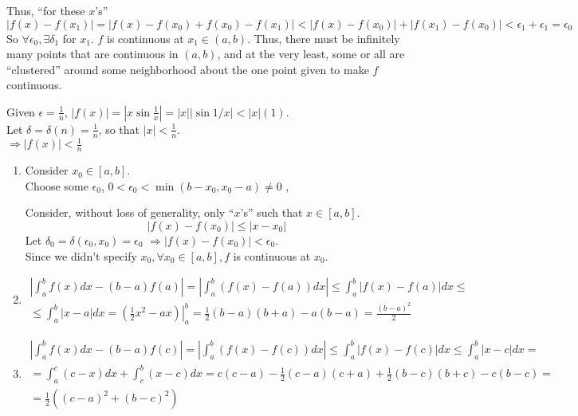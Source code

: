 \documentclass[twoside]{amsart}
\theoremstyle{plain}
\theoremstyle{definition}
\newcommand{\exercisehead}[1]
  {\smallskip
   \noindent{\small\bf Exercise #1.}}
\begin{document}
Thus, ``for these $x$'s''
\[
| f(x) - f(x_1) | = |f(x) -f(x_0) + f(x_0) -f(x_1) | < | f(x) -f(x_0)| + |f(x_1) -f(x_0)| < \epsilon_1 + \epsilon_1 = \epsilon_0
\]
So $\forall \epsilon_0, \exists \delta_1$ for $x_1$.  $f$ is continuous at $x_1 \in (a,b)$.  Thus, there must be infinitely many points that are continuous in $(a,b)$, and at the very least, some or all are ``clustered'' around some neighborhood about the one point given to make $f$ continuous.  

\exercisehead{32} Given $\epsilon = \frac{1}{n}$, $|f(x)| = |x \sin{ \frac{1}{x} } | = |x| | \sin{ 1/x} | < |x| (1) $.  \\
\quad Let $\delta = \delta(n) = \frac{1}{n}$, so that $|x| < \frac{1}{n}$.  \\
$\Longrightarrow |f(x) | <\frac{1}{n}$

\exercisehead{33} \begin{enumerate}
\item Consider $x_0 \in [a,b]$.  \medskip \\
Choose some $\epsilon_0$, $0 < \epsilon_0 < \min{ (b-x_0, x_0 -a ) } \neq 0$ , \,  

Consider, without loss of generality, only ``$x$'s'' such that $x \in [a,b]$.  
\[
|f(x) -f(x_0)| \leq |x -x_0|
\]
Let $\delta_0 = \delta(\epsilon_0,x_0) = \epsilon_0$ $\Longrightarrow |f(x)-f(x_0)| < \epsilon_0$.  \medskip \\
Since we didn't specify $x_0, \forall x_0 \in [a,b], f$ is continuous at $x_0$.  
\item \[
\begin{gathered}
\left| \int_a^b f(x) dx - (b-a) f(a) \right| = \left| \int_a^b (f(x) -f(a)) dx \right| \leq \int_a^b |f(x) -f(a) | dx \leq \\
\leq \int_a^b |x-a| dx = \left. (\frac{1}{2} x^2 -ax ) \right|_a^b = \frac{1}{2} (b-a)(b+a) - a(b-a) = \frac{ (b-a)^2}{2} 
\end{gathered}
\]
\item \[
\begin{gathered}
  \left| \int_a^b f(x) dx - (b-a) f(c) \right| = \left| \int_a^b (f(x) -f(c) ) dx \right| \leq \int_a^b |f(x) -f(c) | dx \leq \int_a^b |x-c| dx = \\
  = \int_a^c (c-x)dx + \int_c^b (x-c) dx = c(c-a) - \frac{1}{2} (c-a)(c+a) + \frac{1}{2} (b-c)(b+c) -c(b-c) = \\
  = \frac{1}{2} ( (c-a)^2 + (b-c)^2) 
\end{gathered}
\]


\end{enumerate}
\end{document}
